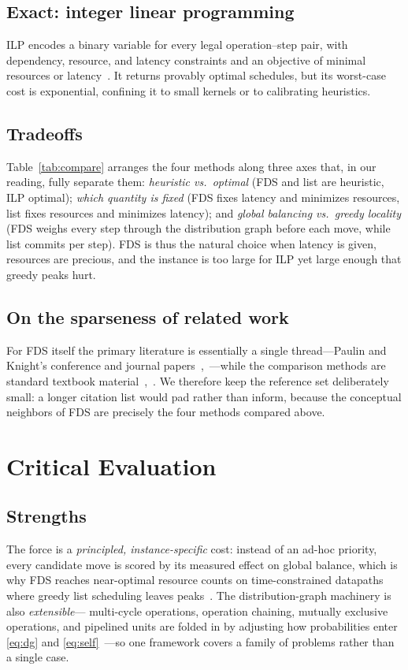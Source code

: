\documentclass[conference]{IEEEtran}
\begin{document}
\subsection{Exact: integer linear programming}
ILP encodes a binary variable for every legal operation--step pair, with
dependency, resource, and latency constraints and an objective of minimal
resources or latency~\cite{b2}. It returns provably optimal schedules, but its
worst-case cost is exponential, confining it to small kernels or to calibrating
heuristics.

\subsection{Tradeoffs}
Table~\ref{tab:compare} arranges the four methods along three axes that, in our
reading, fully separate them: \emph{heuristic vs.\ optimal} (FDS and list are
heuristic, ILP optimal); \emph{which quantity is fixed} (FDS fixes latency and
minimizes resources, list fixes resources and minimizes latency); and
\emph{global balancing vs.\ greedy locality} (FDS weighs every step through the
distribution graph before each move, while list commits per step). FDS is thus
the natural choice when latency is given, resources are precious, and the
instance is too large for ILP yet large enough that greedy peaks hurt.

\subsection{On the sparseness of related work}
For FDS itself the primary literature is essentially a single thread---Paulin
and Knight's conference and journal papers~\cite{b4},~\cite{b1}---while the
comparison methods are standard textbook material~\cite{b2},~\cite{b3}. We
therefore keep the reference set deliberately small: a longer citation list
would pad rather than inform, because the conceptual neighbors of FDS are
precisely the four methods compared above.

\section{Critical Evaluation}\label{sec:eval}

\subsection{Strengths}
The force is a \emph{principled, instance-specific} cost: instead of an
ad-hoc priority, every candidate move is scored by its measured effect on
global balance, which is why FDS reaches near-optimal resource counts on
time-constrained datapaths where greedy list scheduling leaves
peaks~\cite{b1}. The distribution-graph machinery is also \emph{extensible}---
multi-cycle operations, operation chaining, mutually exclusive operations, and
pipelined units are folded in by adjusting how probabilities enter
\eqref{eq:dg} and \eqref{eq:self}~\cite{b1}---so one framework covers a family
of problems rather than a single case.
\end{document}
